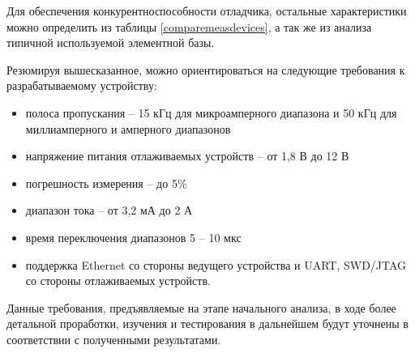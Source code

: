 Для обеспечения конкурентноспособности отладчика, остальные характеристики можно определить 
из таблицы \ref{comparemeasdevices}, а так же из анализа типичной используемой элементной базы.

Резюмируя вышесказанное, можно ориентироваться на следующие требования к разрабатываемому 
устройству:
\begin{itemize}
    \item полоса пропускания -- 15 кГц для микроамперного диапазона и 50 кГц для миллиамперного и 
    амперного диапазонов
    \item напряжение питания отлаживаемых устройств -- от 1,8 В до 12 В
    \item погрешность измерения -- до 5\%
    \item диапазон тока -- от 3,2 мА до 2 А
    \item время переключения диапазонов 5 -- 10 мкс
    \item поддержка Ethernet со стороны ведущего устройства и UART, SWD/JTAG со стороны отлаживаемых
    устройств.
\end{itemize}

Данные требования, предъявляемые на этапе начального анализа, в ходе более детальной проработки,
изучения и тестирования в дальнейшем будут уточнены в соответствии с полученными результатами.
